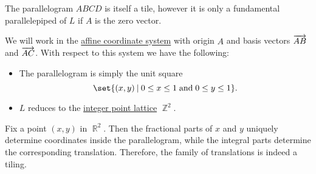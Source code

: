 \begin{comments}
  \item The parallelogram \( ABCD \) is itself a tile, however it is only a fundamental parallelepiped of \( L \) if \( A \) is the zero vector.
\end{comments}
\begin{defproof}
  We will work in the \hyperref[def:affine_coordinate_system]{affine coordinate system} with origin \( A \) and basis vectors \( \overrightarrow{AB} \) and \( \overrightarrow{AC} \). With respect to this system we have the following:
  \begin{itemize}
    \item The parallelogram is simply the unit square
    \begin{equation*}
      \set{ (x, y) \given 0 \leq x \leq 1 \T{and} 0 \leq y \leq 1 }.
    \end{equation*}

    \item \( L \) reduces to the \hyperref[def:integer_point_lattice]{integer point lattice} \( \BbbZ^2 \).
  \end{itemize}

  Fix a point \( (x, y) \) in \( \BbbR^2 \). Then the fractional parts of \( x \) and \( y \) uniquely determine coordinates inside the parallelogram, while the integral parts determine the corresponding translation. Therefore, the family of translations is indeed a tiling.
\end{defproof}

